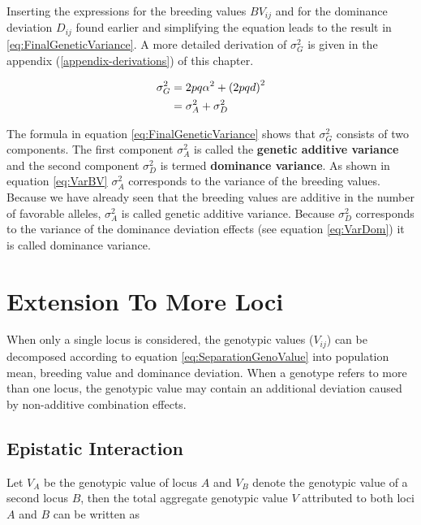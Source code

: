 \documentclass[]{book}
\theoremstyle{definition}
\theoremstyle{definition}
\theoremstyle{definition}
\theoremstyle{remark}
\begin{document}
Inserting the expressions for the breeding values \(BV_{ij}\) and for the dominance deviation \(D_{ij}\) found earlier and simplifying the equation leads to the result in \eqref{eq:FinalGeneticVariance}. A more detailed derivation of \(\sigma_G^2\) is given in the appendix (\ref{appendix-derivations}) of this chapter.

\begin{align}
  \sigma_G^2 &=  2pq\alpha^2 + \left(2pqd \right)^2 \notag\\
             &=  \sigma_A^2 + \sigma_D^2
\label{eq:FinalGeneticVariance}             
\end{align}

The formula in equation \eqref{eq:FinalGeneticVariance} shows that \(\sigma_G^2\) consists of two components. The first component \(\sigma_A^2\) is called the \textbf{genetic additive variance} and the second component \(\sigma_D^2\) is termed \textbf{dominance variance}. As shown in equation \eqref{eq:VarBV} \(\sigma_A^2\) corresponds to the variance of the breeding values. Because we have already seen that the breeding values are additive in the number of favorable alleles, \(\sigma_A^2\) is called genetic additive variance. Because \(\sigma_D^2\) corresponds to the variance of the dominance deviation effects (see equation \eqref{eq:VarDom}) it is called dominance variance.

\hypertarget{extension-to-more-loci}{%
\section{Extension To More Loci}\label{extension-to-more-loci}}

When only a single locus is considered, the genotypic values (\(V_{ij}\)) can be decomposed according to equation \eqref{eq:SeparationGenoValue} into population mean, breeding value and dominance deviation. When a genotype refers to more than one locus, the genotypic value may contain an additional deviation caused by non-additive combination effects.

\hypertarget{epistatic-interaction}{%
\subsection{Epistatic Interaction}\label{epistatic-interaction}}

Let \(V_A\) be the genotypic value of locus \(A\) and \(V_B\) denote the genotypic value of a second locus \(B\), then the total aggregate genotypic value \(V\) attributed to both loci \(A\) and \(B\) can be written as
\end{document}
